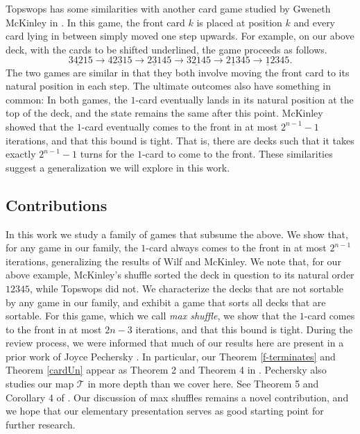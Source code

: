 \documentclass[final,nomarks]{dmtcs-episciences}
\theoremstyle{definition}
\theoremstyle{definition}
\theoremstyle{remark}
\newcommand{\T}{\mathcal{T}} %
\begin{document}
Topswops has some similarities with another card game studied by Gweneth McKinley in \cite{McK2015}. In this game, the front card $k$ is placed at position $k$ and every card lying in between simply moved one step upwards. For example, on our above deck, with the cards to be shifted underlined, the game proceeds as follows.
\[
3\underline{42}15 \to 4\underline{231}5 \to 2\underline{3}145 \to 3\underline{21}45 \to 2\underline{1}345 \to \underline{1}2345.
\]
The two games are similar in that they both involve moving the front card to its natural position in each step. The ultimate outcomes also have something in common: In both games, the $1$-card eventually lands in its natural position at the top of the deck, and the state remains the same after this point. McKinley showed that the $1$-card eventually comes to the front in at most $2^{n-1}-1$ iterations, and that this bound is tight. That is, there are decks such that it takes exactly $2^{n-1}-1$ turns for the $1$-card to come to the front. These similarities suggest a generalization we will explore in this work.

\subsection{Contributions}

In this work we study a family of games that subsume the above. We show that, for any game in our family, the $1$-card always comes to the front in at most $2^{n-1}$ iterations, generalizing the results of Wilf and McKinley. We note that, for our above example, McKinley's shuffle sorted the deck in question to its natural order $12345$, while Topswops did not. We characterize the decks that are not sortable by any game in our family, and exhibit a game that sorts all decks that are sortable. For this game, which we call \textit{max shuffle}, we show that the $1$-card comes to the front in at most $2n-3$ iterations, and that this bound is tight. During the review process, we were informed that much of our results here are present in a prior work of Joyce Pechersky \cite{Pe2023}. In particular, our Theorem \ref{f-terminates} and Theorem \ref{cardUn} appear as Theorem 2 and Theorem 4 in \cite{Pe2023}. Pechersky also studies our map $\T$ in more depth than we cover here. See Theorem 5 and Corollary 4 of \cite{Pe2023}. Our discussion of max shuffles remains a novel contribution, and we hope that our elementary presentation serves as good starting point for further research.
\end{document}
